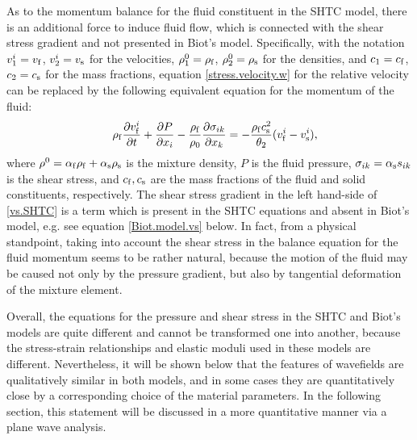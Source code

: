 \documentclass[3p,times,table]{article}
\newcommand{\rhof}{\rho_{\rm f}}
\newcommand{\rhos}{\rho_{\rm s}}
\newcommand{\alphaf}{\alpha_{\rm f}}
\newcommand{\alphas}{\alpha_{\rm s}}
\newcommand{\cf}{c_{\rm f}}
\newcommand{\cs}{c_{\rm s}}
\newcommand{\vf}{v_{\rm f}}
\newcommand{\vs}{v_{\rm s}}
\begin{document}
As to the momentum balance for the fluid constituent in the SHTC 
model, there is 
an additional force to induce fluid flow, which is connected with the shear 
stress gradient and  not presented in Biot's model. 
Specifically, with the notation $v^i_1=\vf$, $v^i_2=\vs$ for the velocities, 
$\rho^0_1=\rhof$, $\rho^0_2=\rhos$ for the densities,  and
$c_1=\cf$, $c_2=\cs$ for the mass fractions, 
equation \eqref{stress.velocity.w} for the relative velocity can be replaced by 
the following equivalent equation for the momentum of the fluid:
\begin{eqnarray}\label{vs.SHTC}
&& \rhof\frac{\partial \vf^i}{\partial t}+ \frac{\partial P}{\partial 
	x_i}-\frac{\rhof}{\rho_0}
\frac{\partial \sigma_{ik}}{\partial x_k}=
-\frac{\rhof\cs^2}{\theta_2}(\vf^i-\vs^i),
\end{eqnarray}
where $\rho^0=\alphaf\rhof+\alphas\rhos$ is the mixture density, 
$P$ is the fluid pressure, $\sigma_{ik}=\alphas s_{ik}$ is 
the shear stress, and $\cf,\cs$ are the mass fractions of the fluid and solid constituents, respectively. The 
shear stress gradient in the left hand-side of \eqref{vs.SHTC} is a term 
which is present in the 
SHTC equations and absent in Biot's model, e.g. see equation 
\eqref{Biot.model.vs} below.  In fact, from a physical standpoint, taking 
into 
account the shear stress in the balance equation for the fluid momentum seems 
to be rather natural, because the motion of the fluid may be caused not only by 
the pressure gradient, but also by tangential deformation of the mixture  
element.



Overall, the equations for the pressure and shear stress in the SHTC and 
Biot's models are quite different and cannot be transformed one into another,  
because the stress-strain relationships and elastic moduli used 
in these models are different. Nevertheless, it will be shown below that the features of 
wavefields are qualitatively similar in both models, and in some cases they are 
quantitatively close  by a corresponding choice of the material parameters. In the 
following section, this statement will be discussed in a more quantitative manner via a plane wave 
analysis.

\end{document}
